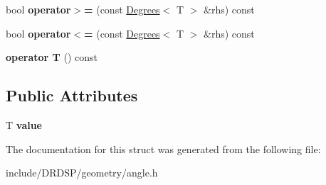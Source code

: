 \begin{DoxyCompactItemize}
\item 
\hypertarget{struct_d_r_d_s_p_1_1_degrees_a4418a174bf12974fc9099c289342ade1}{bool {\bfseries operator$>$=} (const \hyperlink{struct_d_r_d_s_p_1_1_degrees}{Degrees}$<$ T $>$ \&rhs) const }\label{struct_d_r_d_s_p_1_1_degrees_a4418a174bf12974fc9099c289342ade1}

\item 
\hypertarget{struct_d_r_d_s_p_1_1_degrees_a0182f3a600110193a691531aa6eafc3a}{bool {\bfseries operator$<$=} (const \hyperlink{struct_d_r_d_s_p_1_1_degrees}{Degrees}$<$ T $>$ \&rhs) const }\label{struct_d_r_d_s_p_1_1_degrees_a0182f3a600110193a691531aa6eafc3a}

\item 
\hypertarget{struct_d_r_d_s_p_1_1_degrees_a31d8be6980818e2a58f095aa7ebfc439}{{\bfseries operator T} () const }\label{struct_d_r_d_s_p_1_1_degrees_a31d8be6980818e2a58f095aa7ebfc439}

\end{DoxyCompactItemize}
\subsection*{Public Attributes}
\begin{DoxyCompactItemize}
\item 
\hypertarget{struct_d_r_d_s_p_1_1_degrees_a899380ba73155ddf4456cdd44e4088f7}{T {\bfseries value}}\label{struct_d_r_d_s_p_1_1_degrees_a899380ba73155ddf4456cdd44e4088f7}

\end{DoxyCompactItemize}


The documentation for this struct was generated from the following file\-:\begin{DoxyCompactItemize}
\item 
include/\-D\-R\-D\-S\-P/geometry/angle.\-h\end{DoxyCompactItemize}
